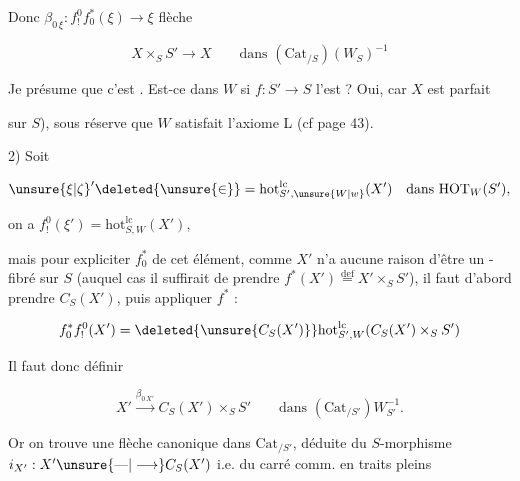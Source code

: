 Donc  $\beta_{0\,\xi}:f_!^0f_0^*(\xi)\longrightarrow\xi$ flèche

\[
 X\times_S S'\longrightarrow X\qquad\text{dans }(\mathrm{Cat}_{/S})(W_S)^{-1}
\]


Je présume que c'est . Est-ce dans $W$ si $f:S'\longrightarrow S$ l'est ? Oui, car $X$ est parfait

sur $S$), sous réserve que $W$ satisfait l'axiome L  (cf page 43).

2) Soit

\[
 \unsure{\xi|\zeta}'\deleted{\unsure{\in}}=\mathrm{hot}_{S',\unsure{W|w}}^{\mathrm{lc}}(X')\quad\text{dans }\mathrm{HOT}_W(S'),
\]

on a $f_!^0(\xi')=\mathrm{hot}_{S,W}^{\mathrm{lc}}(X')$,

mais pour expliciter $f_0^*$ \deleted{\unsure{$\xi$}} de cet élément, comme $X'$ n'a aucune raison d'être  un -fibré sur $S$ (auquel cas il suffirait de prendre $f^*(X')\overset{\mathrm{def}}=X'\times_S S'$), il faut d'abord prendre $C_S(X')$, puis appliquer $f^*$ :

\[
 f_0^*f_!^0(X')=\deleted{\unsure{C_S(X')}}\mathrm{hot}_{S',W}^{\mathrm{lc}}(C_S(X')\times_S S')
\]

Il faut donc définir

\[
 X'\xrightarrow{\beta_{0\,X'}} C_S(X')\times_S S'
 \qquad\text{dans }(\mathrm{Cat}_{/S'})W_{S'}^{-1}.
\]

Or on trouve une flèche canonique dans $\mathrm{Cat}_{/S'}$, déduite du $S$-morphisme $i_{X'}:X'\unsure{\text{---}|\longrightarrow} C_S(X')$ i.e. du carré comm. en traits pleins


